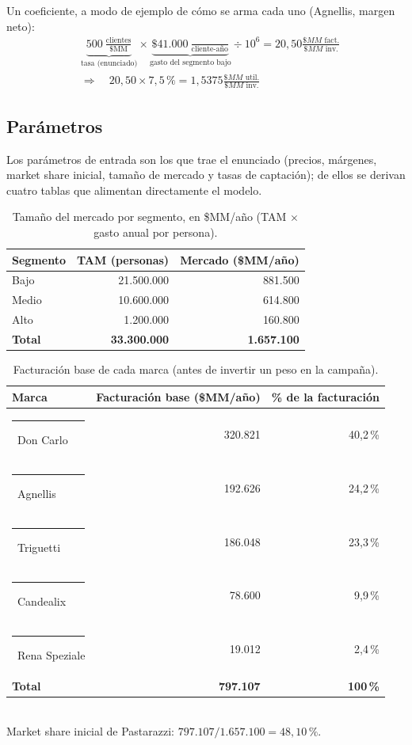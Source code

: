 \documentclass[10pt,a4paper]{article}
\newcommand{\marca}[2]{\textcolor{#1}{\rule{0.28cm}{0.28cm}}~#2}
\begin{document}
Un coeficiente, a modo de ejemplo de cómo se arma cada uno (Agnellis, margen
neto):
\[
\begin{aligned}
&\underbrace{500\ \tfrac{\text{clientes}}{\text{\$MM}}}_{\text{tasa (enunciado)}}
\times
\underbrace{\$41.000\ \tfrac{}{\text{cliente-año}}}_{\text{gasto del segmento bajo}}
\div 10^6
= 20{,}50 \tfrac{\$MM\text{ fact.}}{\$MM\text{ inv.}} \\[4pt]
&\Longrightarrow\quad
20{,}50 \times 7{,}5\,\% = 1{,}5375 \tfrac{\$MM\text{ util.}}{\$MM\text{ inv.}}
\end{aligned}
\]

\subsection{Parámetros}
\label{sec:parametros}

Los parámetros de entrada son los que trae el enunciado (precios, márgenes,
market share inicial, tamaño de mercado y tasas de captación); de ellos se
derivan cuatro tablas que alimentan directamente el modelo.

\begin{table}[htbp]
\centering\small
\caption{Tamaño del mercado por segmento, en \$MM/año (TAM $\times$ gasto anual por persona).}
\begin{tabular}{lrr}
\toprule
Segmento & TAM (personas) & Mercado (\$MM/año) \\
\midrule
Bajo  & 21.500.000 & 881.500 \\
Medio & 10.600.000 & 614.800 \\
Alto  &  1.200.000 & 160.800 \\
\midrule
\textbf{Total} & \textbf{33.300.000} & \textbf{1.657.100} \\
\bottomrule
\end{tabular}
\end{table}

\begin{table}[htbp]
\centering\small
\caption{Facturación base de cada marca (antes de invertir un peso en la campaña).}
\begin{tabular}{lrr}
\toprule
Marca & Facturación base (\$MM/año) & \% de la facturación \\
\midrule
\marca{doncarlo}{Don Carlo}      & 320.821 & 40{,}2\,\% \\
\marca{agnellis}{Agnellis}       & 192.626 & 24{,}2\,\% \\
\marca{triguetti}{Triguetti}     & 186.048 & 23{,}3\,\% \\
\marca{candealix}{Candealix}     &  78.600 &  9{,}9\,\% \\
\marca{rena}{Rena Speziale}      &  19.012 &  2{,}4\,\% \\
\midrule
\textbf{Total} & \textbf{797.107} & \textbf{100\,\%} \\
\bottomrule
\end{tabular}
\vspace{1mm}\\
\footnotesize Market share inicial de Pastarazzi: $797.107 / 1.657.100 = 48{,}10\,\%$.
\end{table}
\end{document}

